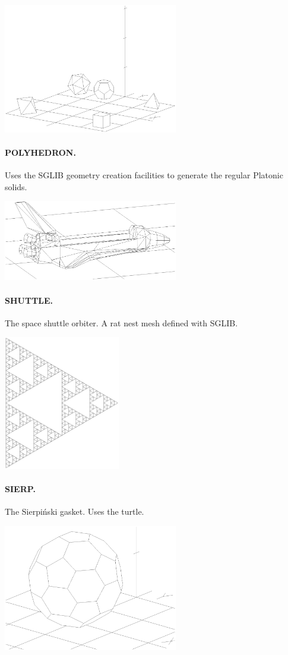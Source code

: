 \documentclass{article}
\begin{document}
\centerline{\includegraphics[width=3in]{cwfig11.eps}}
\paragraph{POLYHEDRON.}  Uses the SGLIB geometry creation
                facilities to generate the regular Platonic solids.

\centerline{\includegraphics[width=3in]{cwfig5.eps}}
\paragraph{SHUTTLE.}  The space shuttle orbiter.  A rat nest mesh defined
                with SGLIB.

\centerline{\includegraphics[width=2in]{cwfig12.eps}}
\paragraph{SIERP.}  The Sierpi\'{n}ski gasket.  Uses the turtle.

\centerline{\includegraphics[width=3in]{cwfig6.eps}}
\end{document}
